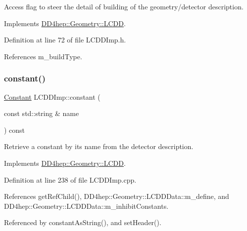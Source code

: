 Access flag to steer the detail of building of the geometry/detector description. 



Implements \hyperlink{class_d_d4hep_1_1_geometry_1_1_l_c_d_d_a73400f14f6384e1c84470595fc3667fd}{D\+D4hep\+::\+Geometry\+::\+L\+C\+DD}.



Definition at line 72 of file L\+C\+D\+D\+Imp.\+h.



References m\+\_\+build\+Type.

\hypertarget{class_d_d4hep_1_1_geometry_1_1_l_c_d_d_imp_a3c0bff57a62ca9d137206b6f6d5448d2}{}\label{class_d_d4hep_1_1_geometry_1_1_l_c_d_d_imp_a3c0bff57a62ca9d137206b6f6d5448d2} 
\subsubsection{\texorpdfstring{constant()}{constant()}}
{\footnotesize\ttfamily \hyperlink{class_d_d4hep_1_1_geometry_1_1_constant}{Constant} L\+C\+D\+D\+Imp\+::constant (\begin{DoxyParamCaption}\item[{const std\+::string \&}]{name }\end{DoxyParamCaption}) const\hspace{0.3cm}{\ttfamily [virtual]}}



Retrieve a constant by it\textquotesingle{}s name from the detector description. 



Implements \hyperlink{class_d_d4hep_1_1_geometry_1_1_l_c_d_d_a7c7e23e0ff875bf83493430bfaeb77c4}{D\+D4hep\+::\+Geometry\+::\+L\+C\+DD}.



Definition at line 238 of file L\+C\+D\+D\+Imp.\+cpp.



References get\+Ref\+Child(), D\+D4hep\+::\+Geometry\+::\+L\+C\+D\+D\+Data\+::m\+\_\+define, and D\+D4hep\+::\+Geometry\+::\+L\+C\+D\+D\+Data\+::m\+\_\+inhibit\+Constants.



Referenced by constant\+As\+String(), and set\+Header().

\hypertarget{class_d_d4hep_1_1_geometry_1_1_l_c_d_d_imp_adec48130368cda76cd52ebb6a792225b}{}\label{class_d_d4hep_1_1_geometry_1_1_l_c_d_d_imp_adec48130368cda76cd52ebb6a792225b} 
